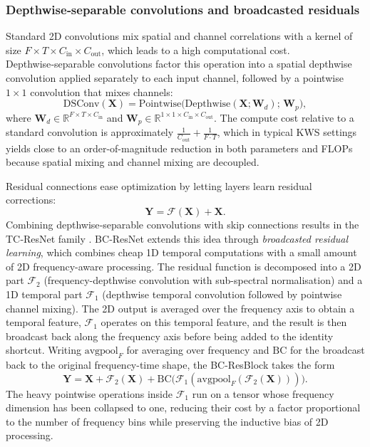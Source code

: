 \documentclass[11pt]{article}
\begin{document}
\subsubsection{Depthwise‑separable convolutions and broadcasted residuals}
Standard 2D convolutions mix spatial and channel correlations with a kernel of size $F \times T \times C_{\text{in}} \times C_{\text{out}}$, which leads to a high computational cost. 
Depthwise‑separable convolutions \cite{dsconv} factor this operation into a spatial depthwise convolution applied separately to each input channel, followed by a pointwise $1 \times 1$ convolution that mixes channels:
\begin{equation}
    \text{DSConv}(\mathbf{X}) = \text{Pointwise}\bigl(\text{Depthwise}(\mathbf{X}; \mathbf{W}_d);\, \mathbf{W}_p\bigr),
\end{equation}
where $\mathbf{W}_d \in \mathbb{R}^{F \times T \times C_{\text{in}}}$ and $\mathbf{W}_p \in \mathbb{R}^{1 \times 1 \times C_{\text{in}} \times C_{\text{out}}}$. 
The compute cost relative to a standard convolution is approximately $\tfrac{1}{C_{\text{out}}} + \tfrac{1}{F\cdot T}$, which in typical KWS settings yields close to an order-of-magnitude reduction in both parameters and FLOPs because spatial mixing and channel mixing are decoupled.

Residual connections \cite{resnet} ease optimization by letting layers learn residual corrections:
\begin{equation}
    \mathbf{Y} = \mathcal{F}(\mathbf{X}) + \mathbf{X}.
\end{equation}
Combining depthwise‑separable convolutions with skip connections results in the TC‑ResNet family \cite{tcresnet}.
BC‑ResNet \cite{bcresnet} extends this idea through \emph{broadcasted residual learning}, which combines cheap 1D temporal computations with a small amount of 2D frequency-aware processing.
The residual function is decomposed into a 2D part $\mathcal{F}_2$ (frequency-depthwise convolution with sub-spectral normalisation) and a 1D temporal part $\mathcal{F}_1$ (depthwise temporal convolution followed by pointwise channel mixing).
The 2D output is averaged over the frequency axis to obtain a temporal feature, $\mathcal{F}_1$ operates on this temporal feature, and the result is then broadcast back along the frequency axis before being added to the identity shortcut.
Writing $\mathrm{avgpool}_F$ for averaging over frequency and $\mathrm{BC}$ for the broadcast back to the original frequency-time shape, the BC-ResBlock takes the form
\begin{equation}
    \mathbf{Y} = \mathbf{X} + \mathcal{F}_2(\mathbf{X}) + \mathrm{BC}\bigl(\mathcal{F}_1(\mathrm{avgpool}_F(\mathcal{F}_2(\mathbf{X})))\bigr).
\end{equation}
The heavy pointwise operations inside $\mathcal{F}_1$ run on a tensor whose frequency dimension has been collapsed to one, reducing their cost by a factor proportional to the number of frequency bins while preserving the inductive bias of 2D processing.
\end{document}
